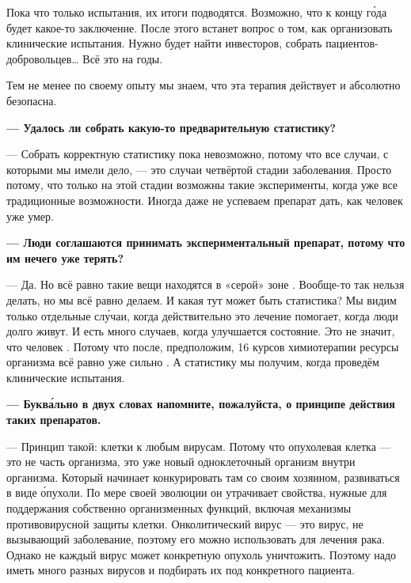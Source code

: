 Пока что  только  испытания, их итоги подводятся. Возможно, что к концу г\'{о}да будет какое-то заключение. После этого встанет вопрос о том, как организовать клинические испытания. Нужно будет найти инвесторов, собрать пациентов-добровольцев\dots{} Всё это  на годы.

Тем не менее по своему опыту мы знаем, что эта терапия действует и абсолютно безопасна.

{\bf --- Удалось ли собрать какую-то предварительную статистику?}

--- Собрать корректную статистику пока невозможно, потому что все случаи, с которыми мы имели дело, --- это случаи четвёртой стадии заболевания. Просто потому, что только на этой стадии возможны такие эксперименты, когда уже  все традиционные возможности. Иногда даже не успеваем препарат дать, как человек уже умер.

{\bf --- Люди соглашаются принимать экспериментальный препарат, потому что им нечего уже терять?}

--- Да. Но всё равно такие вещи находятся в «серой» зоне . Вообще-то так нельзя делать, но мы всё равно делаем. И какая тут может быть статистика? Мы видим только отдельные сл\'{у}чаи, когда действительно это лечение помогает, когда люди долго живут. И есть много случаев, когда улучшается состояние. Это не значит, что человек . Потому что после, предположим, 16 курсов химиотерапии ресурсы организма всё равно уже сильно . А статистику мы получим, когда проведём клинические испытания.

{\bf --- Букв\'{а}льно в двух словах напомните, пожалуйста, о принципе действия таких препаратов.}

--- Принцип такой:  клетки  к любым вирусам. Потому что опухолевая клетка --- это не часть организма, это уже новый одноклеточный организм внутри организма. Который начинает конкурировать там со своим хозяином, развиваться в виде \'{о}пухоли. По мере своей эволюции он утрачивает свойства, нужные для поддержания собственно организменных функций, включая механизмы противовирусной защиты клетки. Онколитический вирус --- это вирус, не вызывающий заболевание, поэтому его можно использовать для лечения рака. Однако не каждый вирус может конкретную опухоль уничтожить. Поэтому надо иметь много разных вирусов и подбирать их под конкретного пациента.

